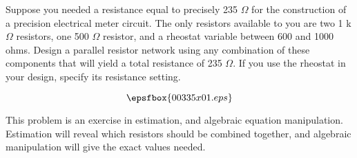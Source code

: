 

Suppose you needed a resistance equal to precisely 235 $\Omega$ for the construction of a precision electrical meter circuit.  The only resistors available to you are two 1 k$\Omega$ resistors, one 500 $\Omega$ resistor, and a rheostat variable between 600 and 1000 ohms.  Design a parallel resistor network using any combination of these components that will yield a total resistance of 235 $\Omega$.  If you use the rheostat in your design, specify its resistance setting.







$$\epsfbox{00335x01.eps}$$







This problem is an exercise in estimation, and algebraic equation manipulation.  Estimation will reveal which resistors should be combined together, and algebraic manipulation will give the exact values needed.




